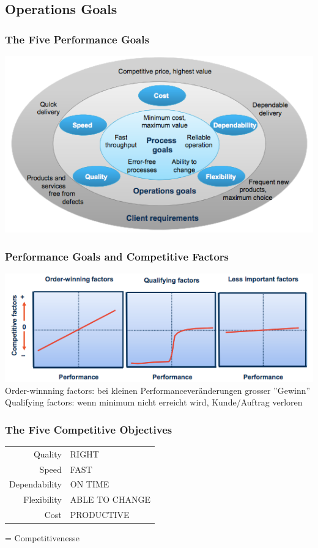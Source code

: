 \subsection{Operations Goals}
\subsubsection{The Five Performance Goals}\label{FivePerformanceGoals}
\includegraphics[width=1\textwidth]{W02/5_performance_goals}
\subsubsection{Performance Goals and Competitive Factors}
\includegraphics[width=1\textwidth]{W02/performancegoals}
Order-winnning factors: bei kleinen Performancever\"anderungen grosser ''Gewinn''\\
Qualifying factors: wenn minimum nicht erreicht wird, Kunde/Auftrag verloren
\subsubsection{The Five Competitive Objectives}
\begin{tabular}{rl}
Quality &  RIGHT\\
Speed &  FAST\\
Dependability & ON TIME\\
Flexibility & ABLE TO CHANGE\\
Cost & PRODUCTIVE\\
\end{tabular} 
= Competitivenesse
